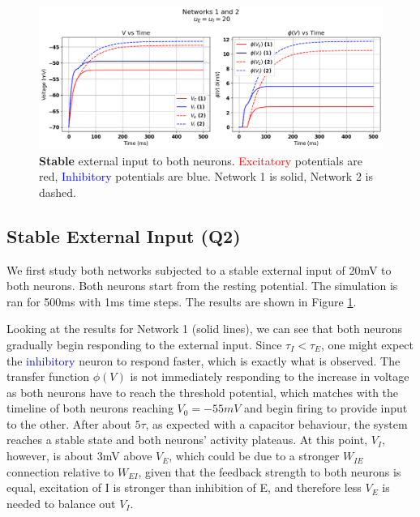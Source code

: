 \documentclass[10pt,twocolumn]{article}
\begin{document}
\begin{figure}
    \centering
    \captionsetup{justification=centering}
    \includegraphics[width=1\textwidth]{images/12-stable.png}
    \caption{
        \textbf{Stable} external input to both neurons.\hspace{\textwidth}
        \textcolor{red}{Excitatory} potentials are red, \textcolor{blue}{Inhibitory} potentials are blue.\hspace{\textwidth}
        Network 1 is solid, Network 2 is dashed.
    }
    \label{fig:stable-input}
\end{figure}

\subsection{Stable External Input (Q2)}
We first study both networks subjected to a stable external input of 20mV to
both neurons.
Both neurons start from the resting potential. The simulation is ran for 500ms
with 1ms time steps. The results are shown in Figure \ref{fig:stable-input}.

Looking at the results for Network 1 (solid lines), we can see that both neurons
gradually begin responding to the external input. Since $\tau_I < \tau_E$,
one might expect the \textcolor{blue}{inhibitory} neuron to respond faster, which is
exactly what is observed. The transfer function $\phi(V)$ is not immediately
responding to the increase in voltage as both neurons have to reach the threshold
potential, which matches with the timeline of both neurons reaching $V_0=-55mV$
and begin firing to provide input to the other. After about $5\tau$, as
expected with a capacitor behaviour, the system reaches a stable state
and both neurons' activity plateaus. At this point, $V_I$, however,
is about 3mV above $V_E$, which could be due to a stronger $W_{IE}$ connection
relative to $W_{EI}$, given that the feedback strength to both neurons is equal,
excitation of I is stronger than inhibition of E, and therefore less $V_E$
is needed to balance out $V_I$.
\end{document}
